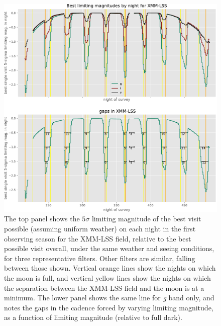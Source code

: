 \documentclass[DM,authoryear,toc]{lsstdoc}
\begin{document}
\begin{figure}
\centering
\includegraphics[width=\linewidth]{figures/night_maglim_xmmlss.pdf}
\caption{\label{fig:nightmaglim}
  The top panel shows the $5\sigma$ limiting magnitude of the best visit possible (assuming uniform weather) on each night in the first observing season for the XMM-LSS field, relative to the best possible visit overall, under the same weather and seeing conditions, for three representative filters.
  Other filters are similar, falling between those shown.
  Vertical orange lines show the nights on which the moon is full, and vertical yellow lines show the nights on which the separation between the XMM-LSS field and the moon is at a minimum.
  The lower panel shows the same line for {\it g} band only, and notes the gaps in the cadence forced by varying limiting magnitude, as a function of limiting magnitude (relative to full dark).
}
\end{figure}
\end{document}

